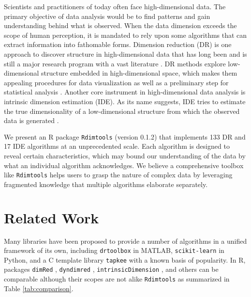 \documentclass[twoside,11pt]{article}
\newcommand\cpp{C\nolinebreak[4]\hspace{-.05em}\raisebox{.4ex}{\relsize{-3}{\textbf{++}}} }
\newcommand{\Rdimtools}{\texttt{Rdimtools} }
\begin{document}
Scientists and practitioners of today often face high-dimensional data. The primary objective of data analysis would be to find patterns and gain understanding behind what is observed. When the data dimension exceeds the scope of human perception, it is mandated to rely upon some algorithms that can extract information into fathomable forms. Dimension reduction (DR) is one approach to discover structure in high-dimensional data that has long been and is still a major research program with a vast literature  \citep{engel_survey_2012a, ma_review_2013a}. DR methods explore low-dimensional structure embedded in high-dimensional space, which makes them appealing procedures for data visualization as well as a preliminary step for statistical analysis \citep{jolliffe_note_1982, mckeown_independent_2003}. Another core instrument in high-dimensional data analysis is intrinsic dimension estimation (IDE). As its name suggests, IDE tries to estimate the true dimensionality of a low-dimensional structure from which the observed data is generated \citep{camastra_intrinsic_2016a}. 

We present an R package \Rdimtools (version 0.1.2) that implements 133 DR and 17 IDE algorithms at an unprecedented scale. Each algorithm is designed to reveal certain characteristics, which may bound our understanding of the data by what an individual algorithm acknowledges. We believe a comprehensive toolbox like \Rdimtools helps users to grasp the nature of complex data by leveraging fragmented knowledge that multiple algorithms elaborate separately.

\section{Related Work}

Many libraries have been proposed to provide a number of algorithms in a unified framework of its own, including \texttt{drtoolbox} \citep{vandermaaten_dimensionality_2009a} in MATLAB, \texttt{scikit-learn} \citep{pedregosa_scikitlearn_2011} in Python, and a \cpp template library \texttt{tapkee} \citep{lisitsyn_tapkee_2013} with a known basis of popularity. In R, packages \texttt{dimRed} \citep{kraemer_dimred_2018}, \texttt{dyndimred} \citep{cannoodt_dyndimred_2020}, \texttt{intrinsicDimension} \citep{johnsson_structures_2016}, and others can be comparable although their scopes are not alike \Rdimtools as summarized in Table \ref{tab:comparison}.
\end{document}
